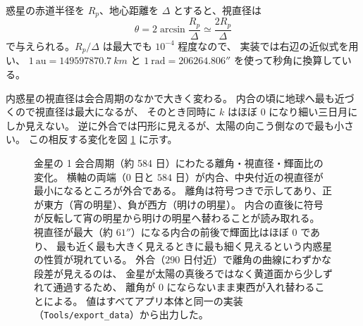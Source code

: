 \documentclass[a4paper,11pt]{ltjsarticle}
\begin{document}
惑星の赤道半径を $R_p$、地心距離を $\Delta$ とすると、視直径は
\begin{equation}
  \theta = 2\arcsin\frac{R_p}{\Delta} \simeq \frac{2R_p}{\Delta}
  \label{eq:diameter}
\end{equation}
で与えられる。$R_p/\Delta$ は最大でも $10^{-4}$ 程度なので、
実装では右辺の近似式を用い、
$1\ \mathrm{au} = \SI{149597870.7}{km}$ と
$1\ \mathrm{rad} = 206264.806''$ を使って秒角に換算している。

内惑星の視直径は会合周期のなかで大きく変わる。
内合の頃に地球へ最も近づくので視直径は最大になるが、
そのとき同時に $k$ はほぼ 0 になり細い三日月にしか見えない。
逆に外合では円形に見えるが、太陽の向こう側なので最も小さい。
この相反する変化を図 \ref{fig:synodic} に示す。

\begin{figure}[htbp]
\centering
{}
\caption{金星の 1 会合周期（約 584 日）にわたる離角・視直径・輝面比の変化。
横軸の両端（$0$ 日と $584$ 日）が内合、中央付近の視直径が最小になるところが外合である。
離角は符号つきで示してあり、正が東方（宵の明星）、負が西方（明けの明星）。
内合の直後に符号が反転して宵の明星から明けの明星へ替わることが読み取れる。
視直径が最大（約 $61''$）になる内合の前後で輝面比はほぼ 0 であり、
最も近く最も大きく見えるときに最も細く見えるという内惑星の性質が現れている。
外合（$290$ 日付近）で離角の曲線にわずかな段差が見えるのは、
金星が太陽の真後ろではなく黄道面から少しずれて通過するため、
離角が 0 にならないまま東西が入れ替わることによる。
値はすべてアプリ本体と同一の実装（\texttt{Tools/export\_data}）から出力した。}
\label{fig:synodic}
\end{figure}
\end{document}
